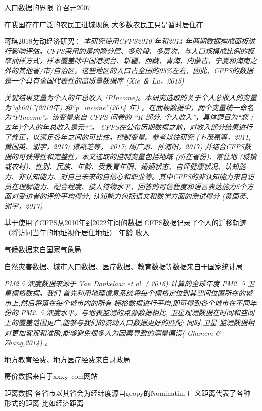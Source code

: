 \documentclass[a4paper,12pt]{article}
\begin{document}
人口数据的界限
许召元2007

在我国存在广泛的农民工进城现象 大多数农民工只是暂时居住在


蒋琪2018劳动经济研究：
\textit{本研究使用CFPS2010 年和2014 年两期数据构成面板进行影响评估。CFPS采用的是内隐分层、多阶段、多层次、与人口规模成比例的概率抽样方式，样本覆盖除中国港澳台、新疆、西藏、青海、内蒙古、宁夏和海南之外的其他省/市/自治区。这些地区的人口占全国的95\%左右，因此，CFPS的数据是一个具有全国代表性的高质量数据库 (Xie ＆ Lu，2015)}

\textit{关键结果变量为个人的年总收入 (PIncome)。本研究选取的关于个人总收入的变量为“qk601”(2010年) 和“p\_income”(2014 年) 。在面板数据中，两个变量统一命名为“PIncome”。该变量来自 CFPS 问卷的 “K 部分: 个人收入”，具体题目为“您 ( 去年)个人的年总收入是元?”。
CFPS在公布历期数据之前，对收入部分结果进行了修正，以满足各年之间的可比性。控制变量。参考以往研究 (卜茂亮等，2011; 黄国英、谢宇，2017; 谭燕芝等， 2017; 周广肃、孙浦阳，2017) 并结合CFPS数据的可获得性和完整性，本文选取的控制变量包括地域 (所在省份)、常住地 (城镇或农村)、性别、民族、年龄、受教育年限、婚姻状态、自评健康状况、认知能力、非认知能力、对自己未来的自信心和职业等。其中CFPS的非认知能力来自访员在理解能力、配合程度、接人待物水平、回答的可信程度和语言表达能力5个方面对受访者的评价平均得分; 认知能力包括语文和数学方面的测试得分 (黄国英、谢宇，2017)}


基于使用了CFPS从2010年到2022年间的数据
CFPS数据记录了个人的迁移轨迹（将访问当年的地址视作居住地址）
年龄
收入

气候数据来自国家气象局

自然灾害数据、城市人口数据、医疗数据、教育数据等数据来自于国家统计局

\textit{PM2.5 浓度数据来源于 Van Donkelaar et al. ( 2016) 计算的全球年度 PM2. 5 卫星栅格数据。我们 首先利用地理信息系统将每个栅格定位到其空间位置所在的城市上,然后将落在每个城市内的所有 栅格数据进行平均,即可得到各个城市在不同年份的 PM2. 5 浓度水平。与地表监测的点源数据相比, 卫星观测数据在时间和空间上的覆盖范围更广,能够与我们的流动人口数据更好的匹配; 同时,卫星 监测数据相对更加客观和准确,能够避免很多人为因素导致的测量偏误( Ghanem \& Zhang,2014) 。}


地方教育经费、地方医疗经费来自财政局

房价数据来自于xxx。com网站

距离数据
各省市以其省会为经纬度源自geopy的Nominatim
广义距离代表了各种形式的距离 比如经济距离
\end{document}
